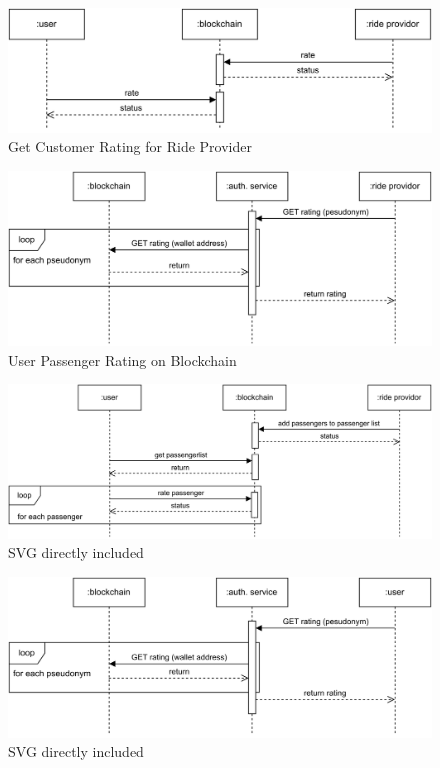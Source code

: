 












\begin{figure}
    \centering
    \includegraphics[width=\linewidth]{data/6.svg}
    \caption{Get Customer Rating for Ride Provider}
    \label{fig:directSVG}
\end{figure}







\begin{figure}
    \centering
    \includegraphics[width=\linewidth]{data/7.svg}
    \caption{User Passenger Rating on Blockchain}
    \label{fig:directSVG}
\end{figure}







\begin{figure}
    \centering
    \includegraphics[width=\linewidth]{data/8.svg}
    \caption{SVG directly included}
    \label{fig:directSVG}
\end{figure}


\begin{figure}
    \centering
    \includegraphics[width=\linewidth]{data/9.svg}
    \caption{SVG directly included}
    \label{fig:directSVG}
\end{figure}
